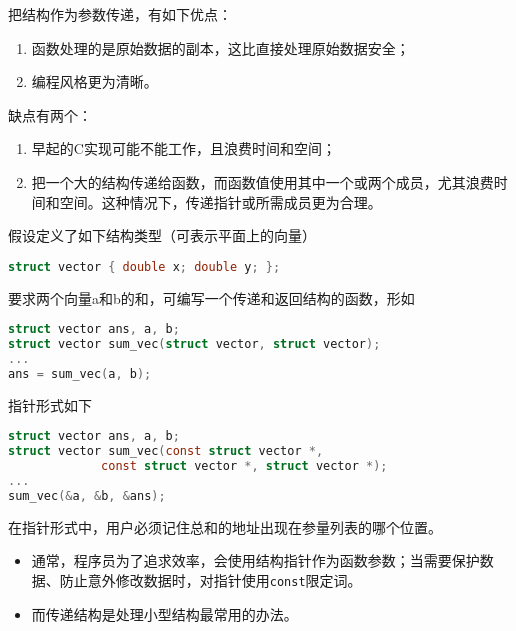 \begin{frame}[fragile]\ft{\subsecname}
把结构作为参数传递，有如下优点：\vspace{0.1in}

\begin{enumerate}
\item 函数处理的是原始数据的副本，这比直接处理原始数据安全；\\[0.1in]
\item 编程风格更为清晰。
\end{enumerate}\vspace{0.1in}

缺点有两个：\vspace{0.1in}

\begin{enumerate}
\item 早起的C实现可能不能工作，且浪费时间和空间；\\[0.1in]
\item 把一个大的结构传递给函数，而函数值使用其中一个或两个成员，尤其浪费时间和空间。这种情况下，传递指针或所需成员更为合理。
\end{enumerate}

\end{frame}

\begin{frame}[fragile]\ft{\subsecname}
假设定义了如下结构类型（可表示平面上的向量）
\begin{lstlisting}[language=c,backgroundcolor=\color{red!20}]
struct vector { double x; double y; };
\end{lstlisting}
要求两个向量a和b的和，可编写一个传递和返回结构的函数，形如
\begin{lstlisting}[language=c,backgroundcolor=\color{red!20}]
struct vector ans, a, b;
struct vector sum_vec(struct vector, struct vector);
...
ans = sum_vec(a, b);
\end{lstlisting}
\end{frame}

\begin{frame}[fragile]\ft{\subsecname}
指针形式如下
\begin{lstlisting}[language=c,backgroundcolor=\color{red!20}]
struct vector ans, a, b;
struct vector sum_vec(const struct vector *, 
             const struct vector *, struct vector *);
...
sum_vec(&a, &b, &ans);
\end{lstlisting}
在指针形式中，用户必须记住总和的地址出现在参量列表的哪个位置。
\end{frame}

\begin{frame}[fragile]\ft{\subsecname}
\begin{itemize}
\item
通常，程序员为了追求效率，会使用结构指针作为函数参数；当需要保护数据、防止意外修改数据时，对指针使用\verb|const|限定词。\\[0.1in]
\item
而传递结构是处理小型结构最常用的办法。
\end{itemize}
\end{frame}

